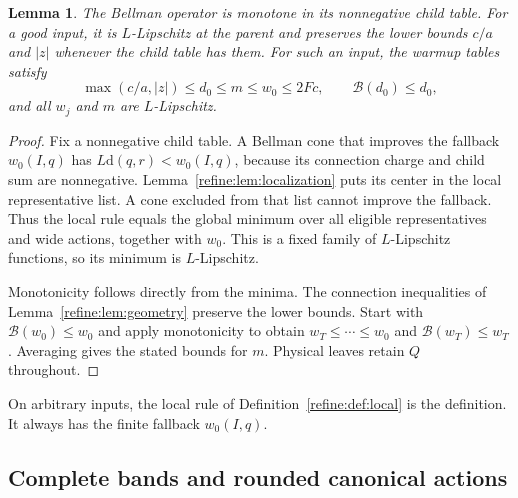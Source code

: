 \documentclass[11pt]{article}
\newtheorem{lemma}[theorem]{Lemma}
\theoremstyle{definition}
\newcommand{\dd}{\mathrm d}
\newcommand{\cB}{\mathcal B}
\newcommand{\1}{\mathbf 1}
\begin{document}
\begin{lemma}\label{refine:lem:warmup}
The Bellman operator is monotone in its nonnegative child table.
For a good input, it is $L$-Lipschitz at the parent and preserves the
lower bounds $c/a$ and $|z|$ whenever the child table has them.
For such an input, the warmup tables satisfy
\[
 \max(c/a,|z|)\le d_0\le m\le w_0\le2Fc,
 \qquad \cB(d_0)\le d_0,
\]
and all $w_j$ and $m$ are $L$-Lipschitz.
\end{lemma}
\begin{proof}
Fix a nonnegative child table. A Bellman cone that improves the fallback
$w_0(I,q)$ has $L\dd(q,r)<w_0(I,q)$, because its connection charge and
child sum are nonnegative. Lemma~\ref{refine:lem:localization} puts
its center in the local representative list. A cone excluded
from that list cannot improve the fallback. Thus the local rule equals
the global minimum over all eligible representatives and wide actions,
together with $w_0$. This is a fixed family of $L$-Lipschitz functions,
so its minimum is $L$-Lipschitz.

Monotonicity follows directly from the minima. The connection
inequalities of Lemma~\ref{refine:lem:geometry} preserve the lower
bounds. Start with $\cB(w_0)\le w_0$ and apply monotonicity to obtain
$w_T\le\cdots\le w_0$ and $\cB(w_T)\le w_T$. Averaging gives the
stated bounds for $m$. Physical leaves retain $Q$ throughout.
\end{proof}

On arbitrary inputs, the local rule of Definition~\ref{refine:def:local}
is the definition. It always has the finite fallback $w_0(I,q)$.

\subsection{Complete bands and rounded canonical actions}
\end{document}
